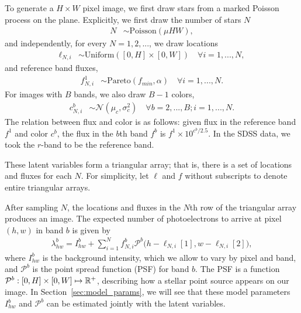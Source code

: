To generate a $H \times W$ pixel image, we first draw stars from a marked Poisson process
on the plane. Explicitly, we first draw the number of stars $N$
\begin{align}
	N &\sim \text{Poisson}(\mu HW),
\end{align}
and independently, for every $N = 1, 2, ... $, we draw locations 
\begin{align}
  \ell_{N, i} &\sim \text{Uniform}([0, H] \times [0, W]) \quad \forall i = 1, ..., N, 
 \end{align}
 and reference band fluxes,
 \begin{align}
  f_{N, i}^{1} & \sim \text{Pareto}(f_{min}, \alpha) \quad \forall i = 1, ..., N. 
  \label{eq:flux_prior}
\end{align}
For images with $B$ bands, we also draw $B - 1$ colors,
\begin{align}
  c_{N, i}^{b}  & \sim \mathcal{N}(\mu_c, \sigma^2_c) \quad \forall b = 2, ..., B; i = 1, ..., N.
\end{align}
The relation between flux and color is as follows: 
given flux in the reference band $f^1$ and color $c^b$, 
the flux in the $b$th band $f^b$ is $f^1 \times 10^{c^b / 2.5}$. 
In the SDSS data, we took the $r$-band to be the reference band. 

These latent variables form a triangular array; that is, 
there is a set of locations and fluxes for each $N$. For simplicity, let
$\ell$ and $f$ without subscripts to denote entire triangular 
arrays. 

After sampling $N$,
the locations and fluxes in the $N$th row of the triangular array 
produces an image.
The expected number of photoelectrons to arrive at pixel $(h,w)$ in band $b$ is given by
\begin{align}
  \lambda^b_{hw} = I^{b}_{hw} + \sum_{i = 1}^N f_{N, i}^b \mathcal{P}^b\big(h - \ell_{N, i}[1], w - \ell_{N,i}[2]\big),
  \label{eq:expected_intensity}
\end{align}
where $I^{b}_{hw}$ is the background intensity, which we allow to vary by pixel and band,
and $\mathcal{P}^b$ is the point spread function (PSF) for band $b$. The PSF
is a function $\mathcal{P}^b : [0, H] \times [0, W] \mapsto \mathbb{R}^+$,
describing how a stellar point source appears
on our image. In Section~\ref{sec:model_params}, we will see 
that these model
parameters $I^{b}_{hw}$ and $\mathcal{P}^b$ can be estimated jointly with
the latent variables.

